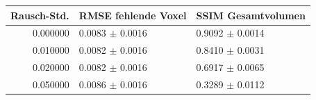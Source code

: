 \begin{tabular}{rll}
\toprule
Rausch-Std. & RMSE fehlende Voxel & SSIM Gesamtvolumen \\
\midrule
0.000000 & 0.0083 $\pm$ 0.0016 & 0.9092 $\pm$ 0.0014 \\
0.010000 & 0.0082 $\pm$ 0.0016 & 0.8410 $\pm$ 0.0031 \\
0.020000 & 0.0082 $\pm$ 0.0016 & 0.6917 $\pm$ 0.0065 \\
0.050000 & 0.0086 $\pm$ 0.0016 & 0.3289 $\pm$ 0.0112 \\
\bottomrule
\end{tabular}

